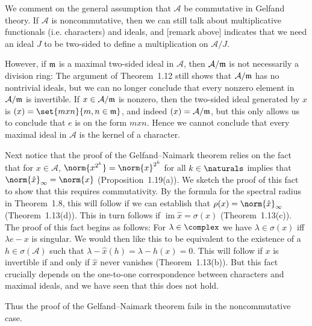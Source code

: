 \documentclass[article, a4paper, 11pt, oneside]{memoir}
\numberwithin{equation}{chapter}
\newcommand{\calA}{\mathcal{A}}
\begin{document}
\begin{remark}
    We comment on the general assumption that $\calA$ be commutative in Gelfand theory. If $\calA$ is noncommutative, then we can still talk about multiplicative functionals (i.e. characters) and ideals, and [remark above] indicates that we need an ideal $J$ to be two-sided to define a multiplication on $\calA/J$.
    
    However, if $\mathfrak{m}$ is a maximal two-sided ideal in $\calA$, then $\calA/\frakm$ is not necessarily a division ring: The argument of Theorem~1.12 still shows that $\calA/\frakm$ has no nontrivial ideals, but we can no longer conclude that every nonzero element in $\calA/\frakm$ is invertible. If $x \in \calA/\frakm$ is nonzero, then the two-sided ideal generated by $x$ is $(x) = \set{mxn}{m,n \in \frakm}$, and indeed $(x) = \calA/\frakm$, but this only allows us to conclude that $e$ is on the form $mxn$. Hence we cannot conclude that every maximal ideal in $\calA$ is the kernel of a character.

    \newcommand{\im}{\operatorname{im}}

    Next notice that the proof of the Gelfand--Naimark theorem relies on the fact that for $x \in \calA$, $\norm{x^{2^k}} = \norm{x}^{2^k}$ for all $k \in \naturals$ implies that $\norm{\hat{x}}_\infty = \norm{x}$ (Proposition~1.19(a)). We sketch the proof of this fact to show that this requires commutativity. By the formula for the spectral radius in Theorem~1.8, this will follow if we can establish that $\rho(x) = \norm{\hat{x}}_\infty$ (Theorem~1.13(d)). This in turn follows if $\im \hat{x} = \sigma(x)$ (Theorem~1.13(c)). The proof of this fact begins as follows: For $\lambda \in \complex$ we have $\lambda \in \sigma(x)$ iff $\lambda e - x$ is singular. We would then like this to be equivalent to the existence of a $h \in \sigma(\calA)$ such that $\lambda - \hat{x}(h) = \lambda - h(x) = 0$. This will follow if $x$ is invertible if and only if $\hat{x}$ never vanishes (Theorem~1.13(b)). But this fact crucially depends on the one-to-one correspondence between characters and maximal ideals, and we have seen that this does not hold.

    Thus the proof of the Gelfand--Naimark theorem fails in the noncommutative case.
\end{remark}
\end{document}
